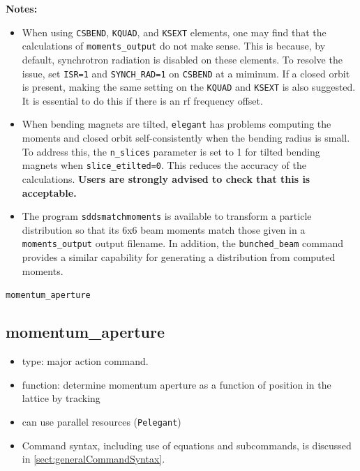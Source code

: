 \documentclass[11pt]{article}
\begin{document}
{\bf Notes:}
\begin{itemize}
\item  When using \verb|CSBEND|, \verb|KQUAD|, and \verb|KSEXT| elements, one may find that the 
calculations of \verb|moments_output| do not make sense. This is because, by default, synchrotron
radiation is disabled on these elements. To resolve the issue, set \verb|ISR=1| and \verb|SYNCH_RAD=1|
on  \verb|CSBEND| at a miminum. If a closed orbit is present, making the same setting on 
the  \verb|KQUAD| and \verb|KSEXT| is also suggested. It is essential to do this if there is
an rf frequency offset.
\item When bending magnets are tilted, \verb|elegant| has problems computing the moments and
closed orbit self-consistently when the bending radius is small.  To address this, the \verb|n_slices| parameter is set to 1 for
tilted bending magnets when \verb|slice_etilted=0|. This reduces the accuracy of the calculations.
{\bf Users are strongly advised to check that this is acceptable.} 
\item The program \verb|sddsmatchmoments| is available to transform a particle distribution so that its 6x6 beam moments
  match those given in a \verb|moments_output| output filename. 
  In addition, the \verb|bunched_beam| command provides a similar capability for generating a distribution from computed
  moments.
\end{itemize}

\newpage
\begin{center}{\Large\verb|momentum_aperture|}\end{center}
\subsection{momentum\_aperture \label{subsec:momentumaperture}}

\begin{itemize}
\item type: major action command.
\item function: determine momentum aperture as a function of position in the lattice by tracking
\item can use parallel resources (\verb|Pelegant|)
\item Command syntax, including use of equations and subcommands, is discussed in \ref{sect:generalCommandSyntax}.
\end{itemize}
\end{document}
